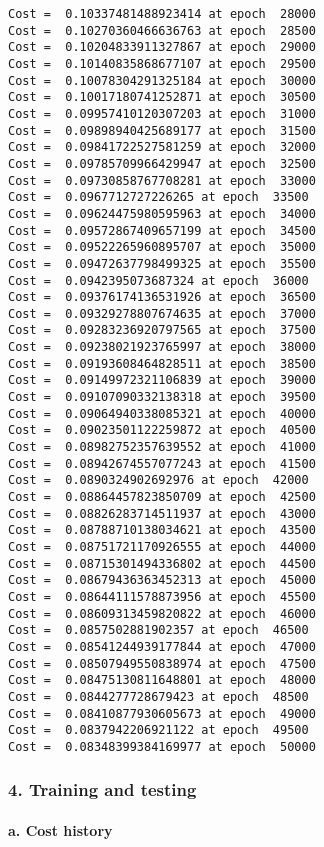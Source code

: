 \documentclass[11pt]{article}
\begin{document}
\begin{Verbatim}[commandchars=\\\{\}]
Cost =  0.10337481488923414 at epoch  28000
Cost =  0.10270360466636763 at epoch  28500
Cost =  0.10204833911327867 at epoch  29000
Cost =  0.10140835868677107 at epoch  29500
Cost =  0.10078304291325184 at epoch  30000
Cost =  0.10017180741252871 at epoch  30500
Cost =  0.09957410120307203 at epoch  31000
Cost =  0.09898940425689177 at epoch  31500
Cost =  0.09841722527581259 at epoch  32000
Cost =  0.09785709966429947 at epoch  32500
Cost =  0.09730858767708281 at epoch  33000
Cost =  0.0967712727226265 at epoch  33500
Cost =  0.09624475980595963 at epoch  34000
Cost =  0.09572867409657199 at epoch  34500
Cost =  0.09522265960895707 at epoch  35000
Cost =  0.09472637798499325 at epoch  35500
Cost =  0.0942395073687324 at epoch  36000
Cost =  0.09376174136531926 at epoch  36500
Cost =  0.09329278807674635 at epoch  37000
Cost =  0.09283236920797565 at epoch  37500
Cost =  0.09238021923765997 at epoch  38000
Cost =  0.09193608464828511 at epoch  38500
Cost =  0.09149972321106839 at epoch  39000
Cost =  0.09107090332138318 at epoch  39500
Cost =  0.09064940338085321 at epoch  40000
Cost =  0.09023501122259872 at epoch  40500
Cost =  0.08982752357639552 at epoch  41000
Cost =  0.08942674557077243 at epoch  41500
Cost =  0.0890324902692976 at epoch  42000
Cost =  0.08864457823850709 at epoch  42500
Cost =  0.08826283714511937 at epoch  43000
Cost =  0.08788710138034621 at epoch  43500
Cost =  0.08751721170926555 at epoch  44000
Cost =  0.08715301494336802 at epoch  44500
Cost =  0.08679436363452313 at epoch  45000
Cost =  0.08644111578873956 at epoch  45500
Cost =  0.08609313459820822 at epoch  46000
Cost =  0.0857502881902357 at epoch  46500
Cost =  0.08541244939177844 at epoch  47000
Cost =  0.08507949550838974 at epoch  47500
Cost =  0.08475130811648801 at epoch  48000
Cost =  0.0844277728679423 at epoch  48500
Cost =  0.08410877930605673 at epoch  49000
Cost =  0.0837942206921122 at epoch  49500
Cost =  0.08348399384169977 at epoch  50000
    \end{Verbatim}

    \hypertarget{training-and-testing}{%
\subsubsection{4. Training and testing}\label{training-and-testing}}

    \hypertarget{a.-cost-history}{%
\paragraph{a. Cost history}\label{a.-cost-history}}
\end{document}
